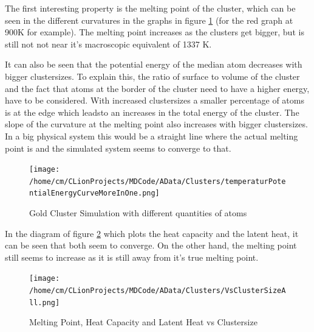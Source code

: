 \par 
The first interesting property is the melting point of the cluster, which can be seen in the different curvatures in the graphs in figure \ref{GoldClusterSimulationTemperaturEnergy4In1} (for the red graph at 900K for example). The melting point increases as the clusters get bigger, but is still not not near it's macroscopic equivalent of 1337 K. 

\par
It can also be seen that the potential energy of the median atom decreases with bigger clustersizes. To explain this, the ratio of surface to volume of the cluster and the fact that atoms at the border of the cluster need to have a higher energy, have to be considered. With increased clustersizes a smaller percentage of atoms is at the edge which leadsto an increases in the total energy of the cluster. 
The slope of the curvature at the melting point also increases with bigger clustersizes. In a big physical system this would be a straight line where the actual melting point is and the simulated system seems to converge to that. 

\begin{figure}
	\begin{center} 
		\texttt{[image: /home/cm/CLionProjects/MDCode/AData/Clusters/temperaturPotentialEnergyCurveMoreInOne.png]} 
	\end{center} 
	\caption[Gold Cluster Simulation]{Gold Cluster Simulation with different quantities of atoms} 
	\label{GoldClusterSimulationTemperaturEnergy4In1} 
\end{figure} 

In the diagram of figure \ref{GoldClusterSimulationVsClustersize} which plots the heat capacity and the latent heat, it can be seen that both seem to converge. On the other hand, the melting point still seems to increase as it is still away from it's true melting point.

\begin{figure}
	\begin{center} 
		\texttt{[image: /home/cm/CLionProjects/MDCode/AData/Clusters/VsClusterSizeAll.png]} 
	\end{center} 
	\caption[Melting Point, Heat Capacity and Latent Heat vs Clustersize]{Melting Point, Heat Capacity and Latent Heat vs Clustersize} 
	\label{GoldClusterSimulationVsClustersize} 
\end{figure} 
